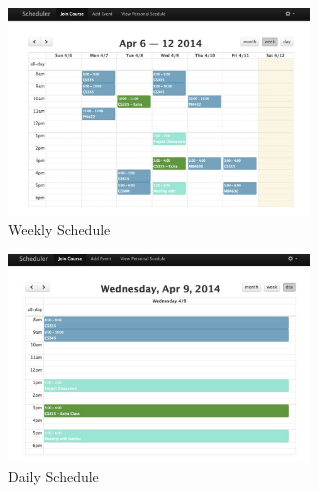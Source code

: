 \documentclass[twocolumn]{article}
\begin{document}






\begin{figure}[t]
	\centering
	\includegraphics[width=80mm]{week.jpg}
	\caption{Weekly Schedule}
	\label{weekly schedule}
\end{figure}

\begin{figure}[t]
	\centering
	\includegraphics[width=80mm]{day.jpg}
	\caption{Daily Schedule}
	\label{weekly schedule}
\end{figure}
\end{document}
